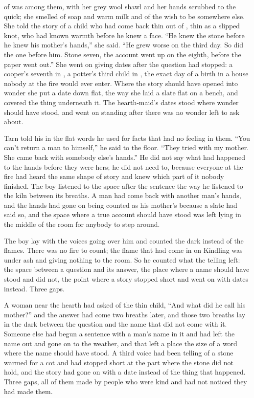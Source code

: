  of  was among them, with her grey wool shawl and her hands scrubbed to the quick; she smelled of soap and warm milk and of the wish to be somewhere else. She told the story of a child who had come back thin out of , thin as a slipped knot, who had known warmth before he knew a face. “He knew the stone before he knew his mother's hands,” she said. “He grew worse on the third day. So did the one before him. Stone seven, the account went up on the eighth, before the paper went out.” She went on giving dates after the question had stopped: a cooper's seventh in , a potter's third child in , the exact day of a birth in a house nobody at the fire would ever enter. Where the story should have opened into wonder she put a date down flat, the way she laid a slate flat on a bench, and covered the thing underneath it. The hearth-maid's dates stood where wonder should have stood, and went on standing after there was no wonder left to ask about.

Tarn told his in the flat words he used for facts that had no feeling in them. “You can't return a man to himself,” he said to the floor. “They tried with my mother. She came back with somebody else's hands.” He did not say what had happened to the hands before they were hers; he did not need to, because everyone at the fire had heard the same shape of story and knew which part of it nobody finished. The boy listened to the space after the sentence the way he listened to the kiln between its breaths. A man had come back with another man's hands, and the hands had gone on being counted as his mother's because a slate had said so, and the space where a true account should have stood was left lying in the middle of the room for anybody to step around.

The boy lay with the voices going over him and counted the dark instead of the flames. There was no fire to count; the flame that had come in on Kindling was under ash and giving nothing to the room. So he counted what the telling left: the space between a question and its answer, the place where a name should have stood and did not, the point where a story stopped short and went on with dates instead. Three gaps.

A woman near the hearth had asked of the thin child, “And what did he call his mother?” and the answer had come two breaths later, and those two breaths lay in the dark between the question and the name that did not come with it. Someone else had begun a sentence with a man's name in it and had left the name out and gone on to the weather, and that left a place the size of a word where the name should have stood. A third voice had been telling of a stone warmed for a cot and had stopped short at the part where the stone did not hold, and the story had gone on with a date instead of the thing that happened. Three gaps, all of them made by people who were kind and had not noticed they had made them.

